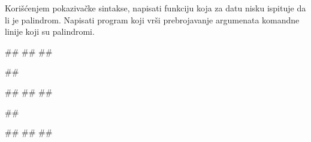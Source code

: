 \begin{Exercise}[label=305]
Korišćenjem pokazivačke sintakse, napisati funkciju koja
za datu nisku ispituje da li je palindrom. Napisati program koji
vrši prebrojavanje argumenata komandne linije koji su
palindromi.


\noindent
\begin{miditest}
\begin{upotreba}{1}
#\naslovInt#
##
##
\end{upotreba}
\end{miditest}
\begin{miditest}
\begin{upotreba}{2}
##

#\naslovInt#
##
##
\end{upotreba}
\end{miditest}
\begin{miditest}
\begin{upotreba}{3}
##

#\naslovInt#
##
##
\end{upotreba}
\end{miditest}

\end{Exercise}
\begin{Answer}[ref=305]
\end{Answer}

